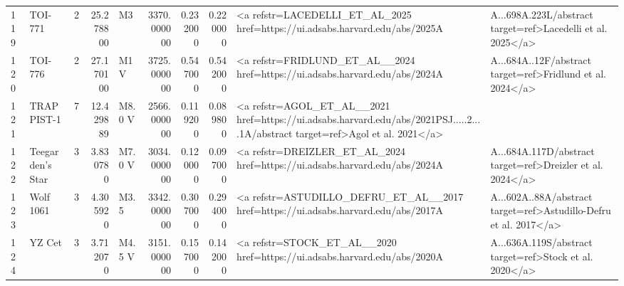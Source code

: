 \begin{tabular}{llrrlrrrl}
119 & TOI-771 & 2 & 25.278800 & M3 & 3370.000000 & 0.232000 & 0.220000 & <a refstr=LACEDELLI_ET_AL_2025 href=https://ui.adsabs.harvard.edu/abs/2025A&A...698A.223L/abstract target=ref>Lacedelli et al. 2025</a> \\
120 & TOI-776 & 2 & 27.170100 & M1 V & 3725.000000 & 0.547000 & 0.542000 & <a refstr=FRIDLUND_ET_AL__2024 href=https://ui.adsabs.harvard.edu/abs/2024A&A...684A..12F/abstract target=ref>Fridlund et al. 2024</a> \\
121 & TRAPPIST-1 & 7 & 12.429889 & M8.0 V & 2566.000000 & 0.119200 & 0.089800 & <a refstr=AGOL_ET_AL__2021 href=https://ui.adsabs.harvard.edu/abs/2021PSJ.....2....1A/abstract target=ref>Agol et al. 2021</a> \\
122 & Teegarden's Star & 3 & 3.830780 & M7.0 V & 3034.000000 & 0.120000 & 0.097000 & <a refstr=DREIZLER_ET_AL_2024 href=https://ui.adsabs.harvard.edu/abs/2024A&A...684A.117D/abstract target=ref>Dreizler et al. 2024</a> \\
123 & Wolf 1061 & 3 & 4.305920 & M3.5 & 3342.000000 & 0.307000 & 0.294000 & <a refstr=ASTUDILLO_DEFRU_ET_AL__2017 href=https://ui.adsabs.harvard.edu/abs/2017A&A...602A..88A/abstract target=ref>Astudillo-Defru et al. 2017</a> \\
124 & YZ Cet & 3 & 3.712070 & M4.5 V & 3151.000000 & 0.157000 & 0.142000 & <a refstr=STOCK_ET_AL__2020 href=https://ui.adsabs.harvard.edu/abs/2020A&A...636A.119S/abstract target=ref>Stock et al. 2020</a> \\
\bottomrule
\end{tabular}
